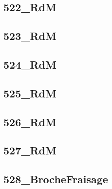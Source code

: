 \subsection{522\_RdM}
\graphicspath{{../12-RDM/TD/Cohesion/522_RdM/images/}{../12-RDM/TD/Cohesion/522_RdM/}{../Style/png/}}


\subsection{523\_RdM}
\graphicspath{{../12-RDM/TD/Cohesion/523_RdM/images/}{../12-RDM/TD/Cohesion/523_RdM/}{../Style/png/}}


\subsection{524\_RdM}
\graphicspath{{../12-RDM/TD/Cohesion/524_RdM/images/}{../12-RDM/TD/Cohesion/524_RdM/}{../Style/png/}}


\subsection{525\_RdM}
\graphicspath{{../12-RDM/TD/Cohesion/525_RdM/images/}{../12-RDM/TD/Cohesion/525_RdM/}{../Style/png/}}


\subsection{526\_RdM}
\graphicspath{{../12-RDM/TD/Cohesion/526_RdM/images/}{../12-RDM/TD/Cohesion/526_RdM/}{../Style/png/}}


\subsection{527\_RdM}
\graphicspath{{../12-RDM/TD/Cohesion/527_RdM/images/}{../12-RDM/TD/Cohesion/527_RdM/}{../Style/png/}}


\subsection{528\_BrocheFraisage}
\graphicspath{{../12-RDM/TD/Cohesion/528_BrocheFraisage/images/}{../12-RDM/TD/Cohesion/528_BrocheFraisage/}{../Style/png/}}


